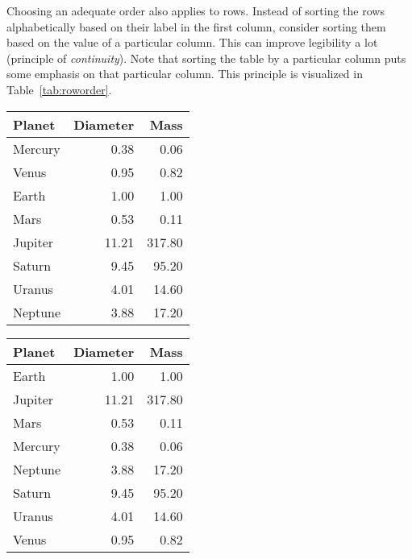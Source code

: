 Choosing an adequate order also applies to rows. Instead of sorting the rows alphabetically based on their label in the first column, consider sorting them based on the value of a particular column. This can improve legibility a lot (principle of \emph{continuity}). Note that sorting the table by a particular column puts some emphasis on that particular column. This principle is visualized in Table~\ref{tab:roworder}.

\begin{table*}[tb]
  \caption{\label{tab:roworder} Listing planets in order from the sun, in alphabetical order, and in descending order of diameter \cite{Carter12}.}
  \centering
  \footnotesize %
  {\renewcommand{\arraystretch}{1.1} %
  \begin{tabularx}{0.3\linewidth}{@{}Xrr@{}} %
    \toprule
    Planet & Diameter & Mass \\
    \midrule
    Mercury & 0.38 & 0.06 \\
    Venus & 0.95 & 0.82 \\
    Earth & 1.00 & 1.00 \\
    Mars & 0.53 & 0.11 \\
    Jupiter & 11.21 & 317.80 \\
    Saturn & 9.45 & 95.20 \\
    Uranus & 4.01 & 14.60 \\
    Neptune & 3.88 & 17.20 \\
    \bottomrule
  \end{tabularx}
  \hspace{\fill}
  \begin{tabularx}{0.3\linewidth}{@{}Xrr@{}} %
    \toprule
    Planet & Diameter & Mass \\
    \midrule
    Earth & 1.00 & 1.00 \\
    Jupiter & 11.21 & 317.80 \\
    Mars & 0.53 & 0.11 \\
    Mercury & 0.38 & 0.06 \\
    Neptune & 3.88 & 17.20 \\
    Saturn & 9.45 & 95.20 \\
    Uranus & 4.01 & 14.60 \\
    Venus & 0.95 & 0.82 \\
    \bottomrule

\end{tabularx}}
\end{table*}

